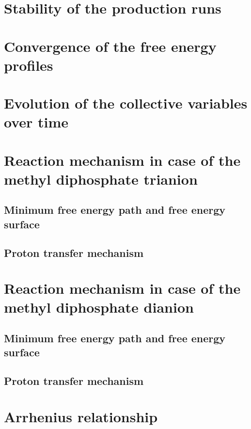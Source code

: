 
\section{Stability of the production runs}




\section{Convergence of the free energy profiles}




\section{Evolution of the collective variables over time}





\section{Reaction mechanism in case of the methyl diphosphate trianion}
\subsection{Minimum free energy path and free energy surface}
\subsection{Proton transfer mechanism}



\section{Reaction mechanism in case of the methyl diphosphate dianion}
\subsection{Minimum free energy path and free energy surface}
\subsection{Proton transfer mechanism}




\section{Arrhenius relationship}




